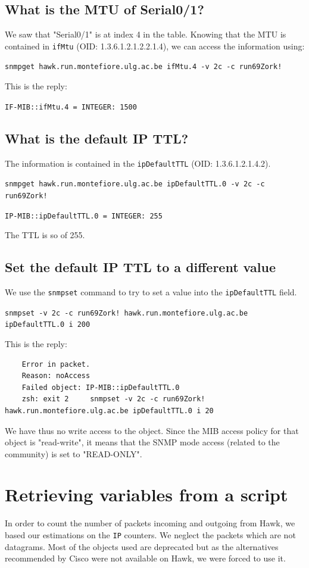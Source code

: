 \documentclass[a4paper,titlepage]{article}
\begin{document}
	\subsection{What is the MTU of Serial0/1?}
We saw that "Serial0/1" is at index 4 in the table. Knowing that the MTU is contained in \texttt{ifMtu} (OID: 1.3.6.1.2.1.2.2.1.4), we can access the information using: 
\begin{center}
	\texttt{snmpget hawk.run.montefiore.ulg.ac.be ifMtu.4 -v 2c -c run69Zork!}
\end{center}
This is the reply: 
\begin{center}
	\texttt{IF-MIB::ifMtu.4 = INTEGER: 1500}
\end{center}

	\subsection{What is the default IP TTL?}
The information is contained in the \texttt{ipDefaultTTL} (OID: 1.3.6.1.2.1.4.2). 

\begin{center}
	\texttt{snmpget hawk.run.montefiore.ulg.ac.be ipDefaultTTL.0 -v 2c -c run69Zork!}
\end{center}
\begin{center}
	\texttt{IP-MIB::ipDefaultTTL.0 = INTEGER: 255}
\end{center}
The TTL is so of 255.

	\subsection{Set the default IP TTL to a different value}
We use the \texttt{snmpset} command to try to set a value into the \texttt{ipDefaultTTL} field.
\begin{center}
	\texttt{snmpset -v 2c -c run69Zork! hawk.run.montefiore.ulg.ac.be ipDefaultTTL.0 i 200}
\end{center}
This is the reply:
\begin{verbatim}
	Error in packet.
	Reason: noAccess
	Failed object: IP-MIB::ipDefaultTTL.0
	zsh: exit 2     snmpset -v 2c -c run69Zork! hawk.run.montefiore.ulg.ac.be ipDefaultTTL.0 i 20
\end{verbatim}
We have thus no write access to the object. Since the MIB access policy for that object is "read-write", it means that the SNMP mode access (related to the community) is set to "READ-ONLY".

\section{Retrieving variables from a script}
In order to count the number of packets incoming and outgoing from Hawk, we based our estimations on the \texttt{IP} counters.  
We neglect the packets which are not datagrams. Most of the objects used are deprecated but as the alternatives recommended by Cisco were not available on Hawk, we were forced to use it.
\end{document}
